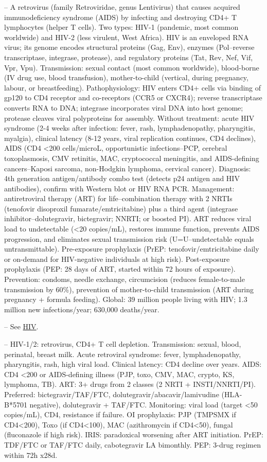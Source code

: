 -- A retrovirus (family Retroviridae, genus Lentivirus) that causes acquired immunodeficiency syndrome (AIDS) by infecting and destroying CD4+ T lymphocytes (helper T cells). Two types: HIV-1 (pandemic, most common worldwide) and HIV-2 (less virulent, West Africa). HIV is an enveloped RNA virus; its genome encodes structural proteins (Gag, Env), enzymes (Pol--reverse transcriptase, integrase, protease), and regulatory proteins (Tat, Rev, Nef, Vif, Vpr, Vpu). Transmission: sexual contact (most common worldwide), blood-borne (IV drug use, blood transfusion), mother-to-child (vertical, during pregnancy, labour, or breastfeeding). Pathophysiology: HIV enters CD4+ cells via binding of gp120 to CD4 receptor and co-receptors (CCR5 or CXCR4); reverse transcriptase converts RNA to DNA; integrase incorporates viral DNA into host genome; protease cleaves viral polyproteins for assembly. Without treatment: acute HIV syndrome (2-4 weeks after infection: fever, rash, lymphadenopathy, pharyngitis, myalgia), clinical latency (8-12 years, viral replication continues, CD4 declines), AIDS (CD4 <200 cells/microL, opportunistic infections--PCP, cerebral toxoplasmosis, CMV retinitis, MAC, cryptococcal meningitis, and AIDS-defining cancers--Kaposi sarcoma, non-Hodgkin lymphoma, cervical cancer). Diagnosis: 4th generation antigen/antibody combo test (detects p24 antigen and HIV antibodies), confirm with Western blot or HIV RNA PCR. Management: antiretroviral therapy (ART) for life--combination therapy with 2 NRTIs (tenofovir disoproxil fumarate/emtricitabine) plus a third agent (integrase inhibitor--dolutegravir, bictegravir; NNRTI; or boosted PI). ART reduces viral load to undetectable (<20 copies/mL), restores immune function, prevents AIDS progression, and eliminates sexual transmission risk (U=U--undetectable equals untransmittable). Pre-exposure prophylaxis (PrEP: tenofovir/emtricitabine daily or on-demand for HIV-negative individuals at high risk). Post-exposure prophylaxis (PEP: 28 days of ART, started within 72 hours of exposure). Prevention: condoms, needle exchange, circumcision (reduces female-to-male transmission by 60\%), prevention of mother-to-child transmission (ART during pregnancy + formula feeding). Global: 39 million people living with HIV; 1.3 million new infections/year; 630,000 deaths/year.

-- See \hyperlink{HIV}{HIV}.

-- HIV-1/2: retrovirus, CD4+ T cell depletion. Transmission: sexual, blood, perinatal, breast milk. Acute retroviral syndrome: fever, lymphadenopathy, pharyngitis, rash, high viral load. Clinical latency: CD4 decline over years. AIDS: CD4 <200 or AIDS-defining illness (PJP, toxo, CMV, MAC, crypto, KS, lymphoma, TB). ART: 3+ drugs from 2 classes (2 NRTI + INSTI/NNRTI/PI). Preferred: bictegravir/TAF/FTC, dolutegravir/abacavir/lamivudine (HLA-B*5701 negative), dolutegravir + TAF/FTC. Monitoring: viral load (target <50 copies/mL), CD4, resistance if failure. OI prophylaxis: PJP (TMPSMX if CD4<200), Toxo (if CD4<100), MAC (azithromycin if CD4<50), fungal (fluconazole if high risk). IRIS: paradoxical worsening after ART initiation. PrEP: TDF/FTC or TAF/FTC daily, cabotegravir LA bimonthly. PEP: 3-drug regimen within 72h x28d.

